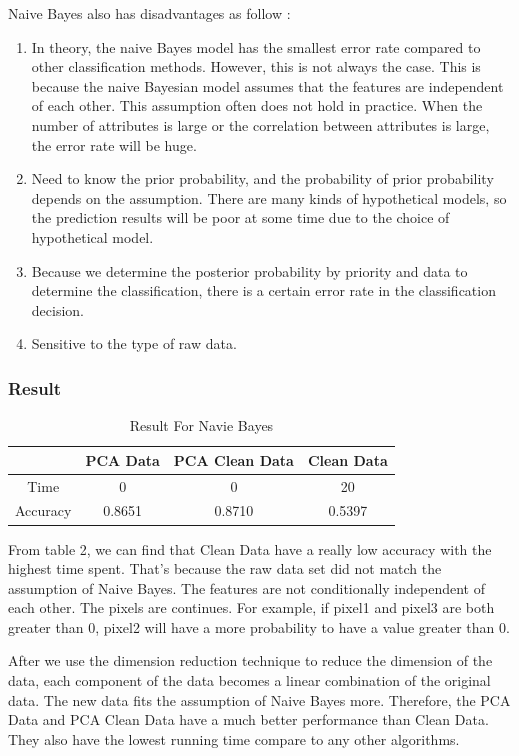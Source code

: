 \documentclass[sigconf]{acmart}
\begin{document}
Naive Bayes also has disadvantages as follow \cite{NB}:
\begin{enumerate}
    \item In theory, the naive Bayes model has the smallest error rate compared to other classification methods. However, this is not always the case. This is because the naive Bayesian model assumes that the features are independent of each other. This assumption often does not hold in practice. When the number of attributes is large or the correlation between attributes is large, the error rate will be huge.
    \item Need to know the prior probability, and the probability of prior probability depends on the assumption. There are many kinds of hypothetical models, so the prediction results will be poor at some time due to the choice of hypothetical model.
    \item Because we determine the posterior probability by priority and data to determine the classification, there is a certain error rate in the classification decision.
    \item Sensitive to the type of raw data.
\end{enumerate}

\subsubsection{Result}

\begin{table}[htb]
    \centering
    \begin{tabular}{|c|c|c|c|} \hline
                 &  PCA Data & PCA Clean Data & Clean Data \\ \hline
        Time     &  0        & 0              & 20         \\
        Accuracy &  0.8651   & 0.8710         & 0.5397     \\ \hline
    \end{tabular}
    \caption{Result For Navie Bayes}
\end{table}

From table 2, we can find that Clean Data have a really low accuracy with the highest time spent. That's because the raw data set did not match the assumption of Naive Bayes. The features are not conditionally independent of each other. The pixels are continues. For example, if pixel1 and pixel3 are both greater than 0, pixel2 will have a more probability to have a value greater than 0.

After we use the dimension reduction technique to reduce the dimension of the data, each component of the data becomes a linear combination of the original data. The new data fits the assumption of Naive Bayes more. Therefore, the PCA Data and PCA Clean Data have a much better performance than Clean Data. They also have the lowest running time compare to any other algorithms. 
\end{document}
